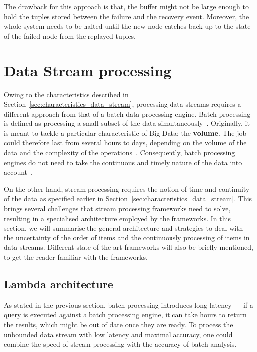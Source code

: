 The drawback for this approach is that, the buffer might not be large enough to 
hold the tuples stored between the failure and the recovery event. Moreover, 
the whole system needs to be halted until the new node catches back up to 
the state of the failed node from the replayed tuples. 

\section{Data Stream processing}

Owing to the characteristics described in Section~\ref{sec:characteristics_data_stream}, 
processing data streams requires a different approach from that of a batch data processing engine.
Batch processing is defined as processing a small subset of the data simultaneously~\cite{batch_processing}. 
Originally, it is meant to tackle a particular characteristic of Big Data; the \textbf{volume}. The job 
could therefore last from several hours to days, depending on the volume of the data and the 
complexity of the operations~\cite{batch_duration}.
Consequently, batch processing engines do not need to take the continuous and 
timely nature of the data into account~\cite{flink}.

On the other hand, stream processing requires the notion of time and continuity of the data as 
specified earlier in Section~\ref{sec:characteristics_data_stream}. This brings several challenges 
that stream processing frameworks need to solve, resulting in a specialised architecture employed by the 
frameworks. In this section, we will summarise the general architecture and strategies to deal with the 
uncertainty of the order of items and the continuously processing of items in data streams. Different 
state of the art frameworks will also be briefly mentioned, to get the reader familiar with the 
frameworks. 

\newpage

\subsection{Lambda architecture}

As stated in the previous section, batch processing introduces long latency --- if a query 
is executed against a batch processing engine, it can take hours to return the results, which might be 
out of date once they are ready. To process the unbounded data stream with low latency and maximal accuracy,
one could combine the speed of stream processing with the accuracy of batch analysis. 


